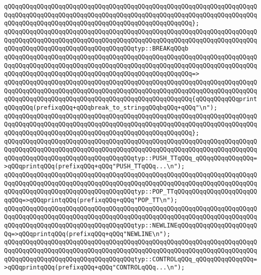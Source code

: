 \verb|qQQqqQQqqQQqqQQqqQQqqQQqqQQqqQQqqQQqqQQqqQQqqQQqqQQqqQQqqQQqqQQqqQQqqQQqqQQqqQQqqQQqqQQqqQQqqQQqqQQqqQQqqQQqqQQqqQQqqQQqqQQqqQQqqQQqqQQqqQQqqQQqqQQqqQQqqQQqqQQqqQQqqQQqqQQqqQQqqQQqqQQqqQQqqQQq};|\newline
\newline
\verb|qQQqqQQqqQQqqQQqqQQqqQQqqQQqqQQqqQQqqQQqqQQqqQQqqQQqqQQqqQQqqQQqqQQqqQQqqQQqqQQqqQQqqQQqqQQqqQQqqQQqqQQqqQQqqQQqqQQqqQQqqQQqqQQqqQQqqQQqqQQqqQQqqQQqqQQqqQQqqQQqqQQqqQQqqQQqqQQqtyp::BREAKqQQqb|\newline
\verb|qQQqqQQqqQQqqQQqqQQqqQQqqQQqqQQqqQQqqQQqqQQqqQQqqQQqqQQqqQQqqQQqqQQqqQQqqQQqqQQqqQQqqQQqqQQqqQQqqQQqqQQqqQQqqQQqqQQqqQQqqQQqqQQqqQQqqQQqqQQqqQQqqQQqqQQqqQQqqQQqqQQqqQQqqQQqqQQqqQQqqQQqqQQqqQQq=>|\newline
\verb|qQQqqQQqqQQqqQQqqQQqqQQqqQQqqQQqqQQqqQQqqQQqqQQqqQQqqQQqqQQqqQQqqQQqqQQqqQQqqQQqqQQqqQQqqQQqqQQqqQQqqQQqqQQqqQQqqQQqqQQqqQQqqQQqqQQqqQQqqQQqqQQqqQQqqQQqqQQqqQQqqQQqqQQqqQQqqQQqqQQqqQQqqQQqqQQq{qQQqqQQqqQQqprintqQQqqQQq(prefixqQQq+qQQqbreak_to_stringqQQqbqQQq+qQQq"\n");|\newline
\verb|qQQqqQQqqQQqqQQqqQQqqQQqqQQqqQQqqQQqqQQqqQQqqQQqqQQqqQQqqQQqqQQqqQQqqQQqqQQqqQQqqQQqqQQqqQQqqQQqqQQqqQQqqQQqqQQqqQQqqQQqqQQqqQQqqQQqqQQqqQQqqQQqqQQqqQQqqQQqqQQqqQQqqQQqqQQqqQQqqQQqqQQqqQQqqQQq};|\newline
\newline
\verb|qQQqqQQqqQQqqQQqqQQqqQQqqQQqqQQqqQQqqQQqqQQqqQQqqQQqqQQqqQQqqQQqqQQqqQQqqQQqqQQqqQQqqQQqqQQqqQQqqQQqqQQqqQQqqQQqqQQqqQQqqQQqqQQqqQQqqQQqqQQqqQQqqQQqqQQqqQQqqQQqqQQqqQQqqQQqqQQqtyp::PUSH_TTqQQq_qQQqqQQqqQQqqQQq=>qQQqprintqQQq(prefixqQQq+qQQq"PUSH_TTqQQq...\n");|\newline
\verb|qQQqqQQqqQQqqQQqqQQqqQQqqQQqqQQqqQQqqQQqqQQqqQQqqQQqqQQqqQQqqQQqqQQqqQQqqQQqqQQqqQQqqQQqqQQqqQQqqQQqqQQqqQQqqQQqqQQqqQQqqQQqqQQqqQQqqQQqqQQqqQQqqQQqqQQqqQQqqQQqqQQqqQQqqQQqqQQqtyp::POP_TTqQQqqQQqqQQqqQQqqQQqqQQqqQQq=>qQQqprintqQQq(prefixqQQq+qQQq"POP_TT\n");|\newline
\newline
\verb|qQQqqQQqqQQqqQQqqQQqqQQqqQQqqQQqqQQqqQQqqQQqqQQqqQQqqQQqqQQqqQQqqQQqqQQqqQQqqQQqqQQqqQQqqQQqqQQqqQQqqQQqqQQqqQQqqQQqqQQqqQQqqQQqqQQqqQQqqQQqqQQqqQQqqQQqqQQqqQQqqQQqqQQqqQQqqQQqtyp::NEWLINEqQQqqQQqqQQqqQQqqQQqqQQq=>qQQqprintqQQq(prefixqQQq+qQQq"NEWLINE\n");|\newline
\verb|qQQqqQQqqQQqqQQqqQQqqQQqqQQqqQQqqQQqqQQqqQQqqQQqqQQqqQQqqQQqqQQqqQQqqQQqqQQqqQQqqQQqqQQqqQQqqQQqqQQqqQQqqQQqqQQqqQQqqQQqqQQqqQQqqQQqqQQqqQQqqQQqqQQqqQQqqQQqqQQqqQQqqQQqqQQqqQQqtyp::CONTROLqQQq_qQQqqQQqqQQqqQQq=>qQQqprintqQQq(prefixqQQq+qQQq"CONTROLqQQq...\n");|\newline
